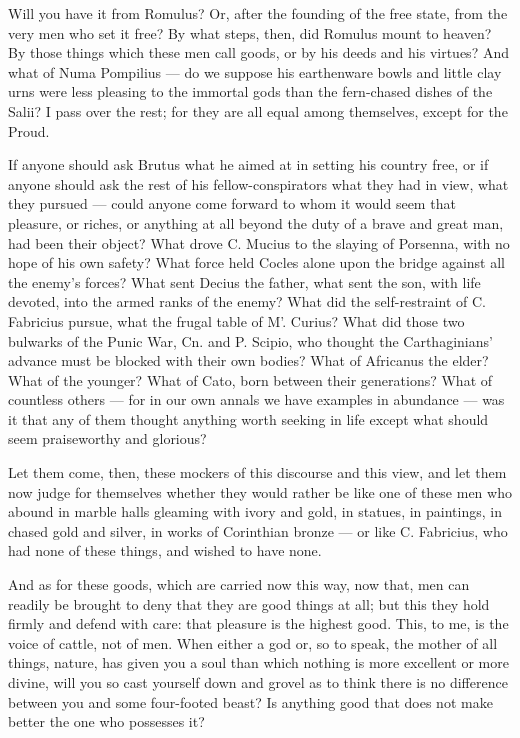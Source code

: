  Will you have it from Romulus? Or, after the founding of the free state, from the very men who set it free? By what steps, then, did Romulus mount to heaven? By those things which these men call goods, or by his deeds and his virtues? And what of Numa Pompilius — do we suppose his earthenware bowls and little clay urns were less pleasing to the immortal gods than the fern-chased dishes of the Salii? I pass over the rest; for they are all equal among themselves, except for the Proud.

 If anyone should ask Brutus what he aimed at in setting his country free, or if anyone should ask the rest of his fellow-conspirators what they had in view, what they pursued — could anyone come forward to whom it would seem that pleasure, or riches, or anything at all beyond the duty of a brave and great man, had been their object? What drove C. Mucius to the slaying of Porsenna, with no hope of his own safety? What force held Cocles alone upon the bridge against all the enemy's forces? What sent Decius the father, what sent the son, with life devoted, into the armed ranks of the enemy? What did the self-restraint of C. Fabricius pursue, what the frugal table of M'. Curius? What did those two bulwarks of the Punic War, Cn. and P. Scipio, who thought the Carthaginians' advance must be blocked with their own bodies? What of Africanus the elder? What of the younger? What of Cato, born between their generations? What of countless others — for in our own annals we have examples in abundance — was it that any of them thought anything worth seeking in life except what should seem praiseworthy and glorious?

 Let them come, then, these mockers of this discourse and this view, and let them now judge for themselves whether they would rather be like one of these men who abound in marble halls gleaming with ivory and gold, in statues, in paintings, in chased gold and silver, in works of Corinthian bronze — or like C. Fabricius, who had none of these things, and wished to have none.

 And as for these goods, which are carried now this way, now that, men can readily be brought to deny that they are good things at all; but this they hold firmly and defend with care: that pleasure is the highest good. This, to me, is the voice of cattle, not of men. When either a god or, so to speak, the mother of all things, nature, has given you a soul than which nothing is more excellent or more divine, will you so cast yourself down and grovel as to think there is no difference between you and some four-footed beast? Is anything good that does not make better the one who possesses it?

